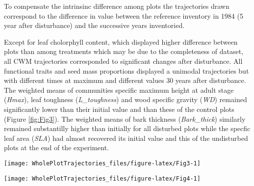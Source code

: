 \documentclass[fleqn,10pt]{ArtEcoFoG} %
\theoremstyle{definition}
\theoremstyle{definition}
\theoremstyle{definition}
\theoremstyle{remark}
\begin{document}
To compensate the intrinsinc difference among plots the trajectories
drawn correspond to the difference in value between the reference
inventory in 1984 (5 year after disturbance) and the successive years
inventoried.

Except for leaf cholorphyll content, which displayed higher difference
between plots than among treatments which may be due to the completeness
of dataset, all CWM trajectories corresponded to significant changes
after disturbance. All functional traits and seed mass proportions
displayed a unimodal trajectories but with different times at maximum
and different values 30 years after disturbance. The weighted means of
communities specific maximum height at adult stage (\emph{Hmax}), leaf
toughness (\emph{L\_toughness}) and wood specific gravity (\emph{WD})
remained significantly lower than their initial value and than these of
the control plots (Figure \ref{fig:Fig3}). The weighted means of bark
thickness (\emph{Bark\_thick}) similarly remained substantilly higher
than initially for all disturbed plots while the specfic leaf area
(\emph{SLA}) had almost recovered its initial value and this of the
undisturbed plots at the end of the experiment.

\begin{figure*}

{\centering \texttt{[image: WholePlotTrajectories\_files/figure-latex/Fig3-1]} 

}

\caption{Trajectories of the communities weighted means (CWM) over 30 years after disturbance of 4 leaf traits (Leaf thickness, *L_thickness*, chlorophyll content, *L_chloro*, toughness, *L_toughness* and specific area, *SLA*), 2 stem traits (wood specific gravity, *WD*, and bark thickness, *Bark-thick*) and one life trait (Specific maximum height at adult stage,*Hmax*). Trajectories correspond to the median (solid line) and 0.025 and 0.975 percentile (gray envelope) observed after 50 iteration of the taxonomic uncertainty propagation and the missing trait value filling processes. Initial treatments are represented by solid lines colorswith green for control, blue for T1,orange for T2 and red for T3.}\label{fig:Fig3}
\end{figure*}

\begin{figure*}

{\centering \texttt{[image: WholePlotTrajectories\_files/figure-latex/Fig4-1]} 

}

\caption{Trajectories of seed mass classes proportions over 30 years after disturbance, corresponding to the median (solid line) and 0.025 and 0.975 percentile (gray envelope) observed after 50 iteration of the taxonomic uncertainty propagation. No gap filling process was applied in this case. Initial treatments are represented by solid lines colors with green for control, blue for T1,orange for T2 and red for T3.}\label{fig:Fig4}
\end{figure*}
\end{document}
